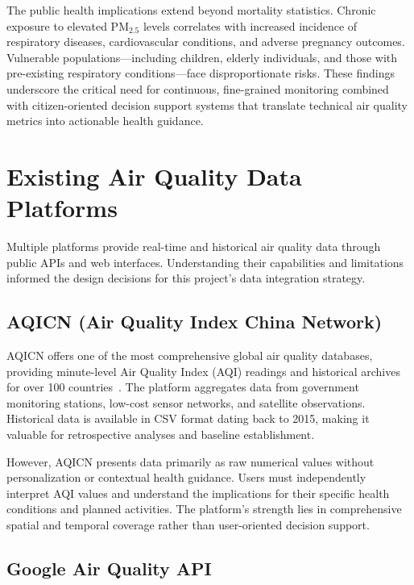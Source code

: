 The public health implications extend beyond mortality statistics. Chronic exposure to elevated PM$_{2.5}$ levels correlates with increased incidence of respiratory diseases, cardiovascular conditions, and adverse pregnancy outcomes. Vulnerable populations—including children, elderly individuals, and those with pre-existing respiratory conditions—face disproportionate risks. These findings underscore the critical need for continuous, fine-grained monitoring combined with citizen-oriented decision support systems that translate technical air quality metrics into actionable health guidance.


\section{Existing Air Quality Data Platforms}
\label{sec:lit_platforms}

Multiple platforms provide real-time and historical air quality data through public APIs and web interfaces. Understanding their capabilities and limitations informed the design decisions for this project's data integration strategy.

\subsection{AQICN (Air Quality Index China Network)}
\label{subsec:lit_aqicn}

AQICN offers one of the most comprehensive global air quality databases, providing minute-level Air Quality Index (AQI) readings and historical archives for over 100 countries~\citep{aqicn}. The platform aggregates data from government monitoring stations, low-cost sensor networks, and satellite observations. Historical data is available in CSV format dating back to 2015, making it valuable for retrospective analyses and baseline establishment.

However, AQICN presents data primarily as raw numerical values without personalization or contextual health guidance. Users must independently interpret AQI values and understand the implications for their specific health conditions and planned activities. The platform's strength lies in comprehensive spatial and temporal coverage rather than user-oriented decision support.

\subsection{Google Air Quality API}
\label{subsec:lit_google}

